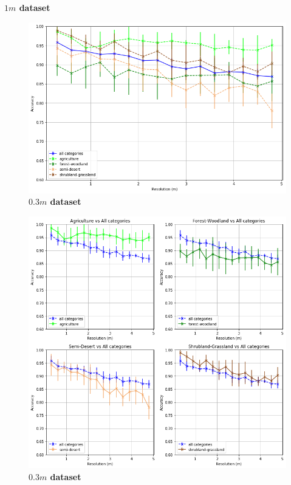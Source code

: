 \begin{table}
    \centering
	
	\captionsetup{width=0.7\linewidth}
	\caption{\textbf{$1m$ dataset}}
\end{table}


\begin{figure}[h!]
	\centering
	\includegraphics[width=\textwidth]{Figures/results/acc_res_all_categories_03m.png}
	\captionsetup{width=1\linewidth}
	\caption{\textbf{$0.3m$ dataset}}
	\label{fig:acc_all_cat_03m}
\end{figure}

\begin{figure}[h!]
	\centering
	\includegraphics[width=\textwidth]{Figures/results/acc_res_by_category_03m.png}
	\captionsetup{width=1\linewidth}
	\caption{\textbf{$0.3m$ dataset}}
	\label{fig:acc_by_cat_03m}
\end{figure}


